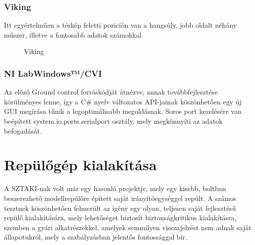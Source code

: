 \documentclass[12pt]{article}
\begin{document}
\begin{itemize}
\subsubsection{Viking}
\cite{bib:viking} Itt egyértelm\H{u}en a térkép feletti pozicíón van a hangsúly, jobb oldalt néhány m\H{u}szer, illetve a fontosabb adatok számokkal


\begin{figure}[H]
	\centering
	\caption{Viking}
	\label{fig:viking}
\end{figure}







\subsubsection{NI LabWindows™/CVI}
Az el\H{o}z\H{o} Ground control forráskódját átnézve, annak továbbfejlesztése körülményes lenne, így a C\# nyelv  változatos API-jainak köszönhet\H{o}en egy új GUI megírása t\H{u}nik a legoptimálisabb megoldásnak. Soros port kezelésére van beépített \cite{bib:serial}system.io.ports.serialport osztály, mely megkönnyíti az adatok befogadását.




\section{Repül\H{o}gép kialakítása}

A SZTAKI-nak volt már egy hasonló projektje, mely egy kisebb, boltban beszerezhet\H{o} modellrepül\H{o}re épített saját irányítóegységgel repült. A számos tesztnek köszönhet\H{o}en felmerült az igény egy olyan, teljesen saját fejlesztés\H{u} repül\H{o} kialakítására, mely lehet\H{o}séget biztosít biztonságkritikus kialakításra, szemben a gyári alkatrészekkel, amelyek semmilyen visszajelzést nem adnak saját állapotukról, mely a szabályzásban jelent\H{o}s fontossággal bír.


\end{itemize}
\end{document}
